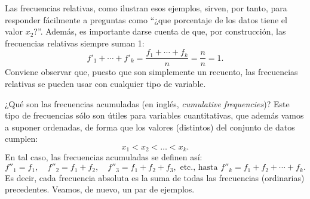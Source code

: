 Las frecuencias relativas, como ilustran esos ejemplos, sirven, por tanto, para responder fácilmente a preguntas como ``¿que porcentaje de los datos tiene el valor $x_2$?''. Además, es importante darse cuenta de que, por construcción, las frecuencias relativas siempre suman 1:
\[f'_1+\cdots+f'_k=\dfrac{f_1+\cdots+f_k}{n}=\dfrac{n}{n}=1.\]
Conviene observar que, puesto que son simplemente un recuento, las frecuencias relativas se pueden usar con cualquier tipo de variable.

¿Qué son las {\sf frecuencias acumuladas} (en inglés, {\em cumulative frequencies})? Este tipo de frecuencias sólo son útiles para variables cuantitativas, que además vamos a suponer ordenadas, de forma que los valores (distintos) del conjunto de datos cumplen:
\[x_1<x_2<\ldots<x_k.\]
En tal caso, las frecuencias acumuladas se definen así:
\[f''_1=f_1,\quad f''_2=f_1+f_2,\quad f''_3=f_1+f_2+f_3,\mbox{ etc., hasta }f''_k=f_1+f_2+\cdots+f_k.\]
Es decir, cada frecuencia absoluta es la suma de todas las frecuencias (ordinarias) precedentes. Veamos, de nuevo, un par de ejemplos.

